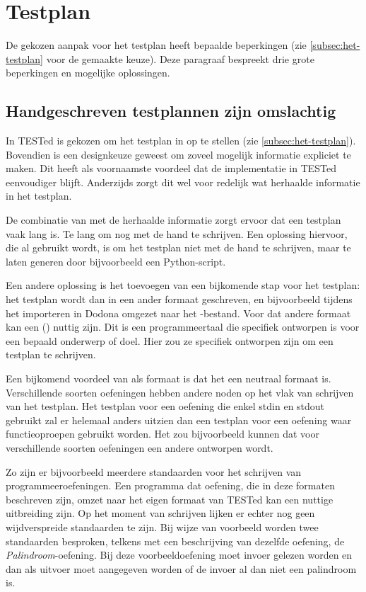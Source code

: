 \section{Testplan}\label{sec:beperkingen-testplan}

De gekozen aanpak voor het testplan heeft bepaalde beperkingen (zie \cref{subsec:het-testplan} voor de gemaakte keuze).
Deze paragraaf bespreekt drie grote beperkingen en mogelijke oplossingen.

\subsection{Handgeschreven testplannen zijn omslachtig}\label{subsec:handgeschreven-testplannen-zijn-omslachtig}

In TESTed is gekozen om het testplan in  op te stellen (zie \cref{subsec:het-testplan}).
Bovendien is een designkeuze geweest om zoveel mogelijk informatie expliciet te maken.
Dit heeft als voornaamste voordeel dat de implementatie in TESTed eenvoudiger blijft.
Anderzijds zorgt dit wel voor redelijk wat herhaalde informatie in het testplan.

De combinatie van  met de herhaalde informatie zorgt ervoor dat een testplan vaak lang is.
Te lang om nog met de hand te schrijven.
Een oplossing hiervoor, die al gebruikt wordt, is om het testplan niet met de hand te schrijven, maar te laten generen door bijvoorbeeld een Python-script.

Een andere oplossing is het toevoegen van een bijkomende stap voor het testplan: het testplan wordt dan in een ander formaat geschreven, en bijvoorbeeld tijdens het importeren in Dodona omgezet naar het -bestand.
Voor dat andere formaat kan een  () nuttig zijn.
Dit is een programmeertaal die specifiek ontworpen is voor een bepaald onderwerp of doel.
Hier zou ze specifiek ontworpen zijn om een testplan te schrijven.

Een bijkomend voordeel van  als formaat is dat het een neutraal formaat is.
Verschillende soorten oefeningen hebben andere noden op het vlak van schrijven van het testplan.
Het testplan voor een oefening die enkel stdin en stdout gebruikt zal er helemaal anders uitzien dan een testplan voor een oefening waar functieoproepen gebruikt worden.
Het zou bijvoorbeeld kunnen dat voor verschillende soorten oefeningen een andere  ontworpen wordt.

Zo zijn er bijvoorbeeld meerdere standaarden voor het schrijven van programmeeroefeningen.
Een programma dat oefening, die in deze formaten beschreven zijn, omzet naar het eigen formaat van TESTed kan een nuttige uitbreiding zijn.
Op het moment van schrijven lijken er echter nog geen wijdverspreide standaarden te zijn.
Bij wijze van voorbeeld worden twee standaarden besproken, telkens met een beschrijving van dezelfde oefening, de \emph{Palindroom}-oefening.
Bij deze voorbeeldoefening moet invoer gelezen worden en dan als uitvoer moet aangegeven worden of de invoer al dan niet een palindroom is.

